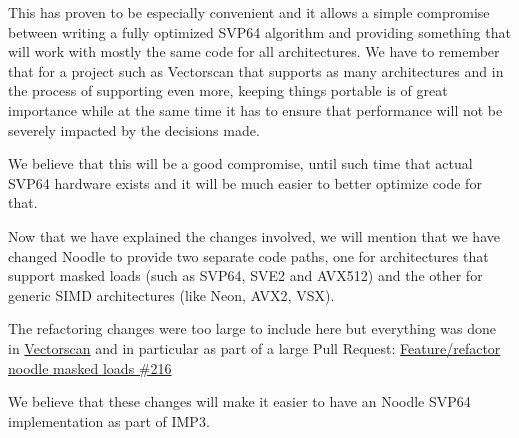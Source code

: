 This has proven to be especially convenient and it allows a simple compromise between writing a fully optimized \acrshort{SVP64} algorithm
and providing something that will work with mostly the same code for all architectures.
We have to remember that for a project such as Vectorscan that supports as many architectures
and in the process of supporting even more, keeping things portable is of great importance
while at the same time it has to ensure that performance will not be severely impacted by the decisions made.
\par

We believe that this will be a good compromise,
until such time that actual \acrshort{SVP64} hardware exists and it will be much easier to better optimize code for that.
\par

Now that we have explained the changes involved, we will mention that we have changed Noodle to provide two separate code paths,
one for architectures that support masked loads (such as \acrshort{SVP64}, \acrshort{SVE2} and \acrshort{AVX512})
and the other for generic \acrshort{SIMD} architectures (like Neon, \acrshort{AVX2}, \acrshort{VSX}).
\par

The refactoring changes were too large to include here
but everything was done in \href{https://github.com/VectorCamp/vectorscan}{Vectorscan} and in particular as part of a large Pull Request:
\href{https://github.com/VectorCamp/vectorscan/pull/216}{Feature/refactor noodle masked loads \#216}
\par

We believe that these changes will make it easier to have an Noodle \acrshort{SVP64} implementation as part of \acrshort{IMP}3.
\par
